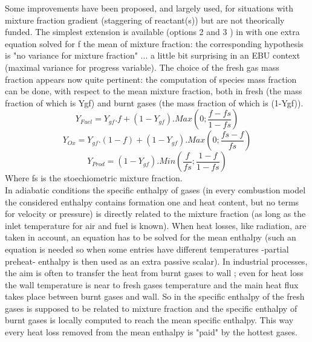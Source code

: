 Some improvements have been proposed, and largely used, for situations
with mixture fraction gradient ({\small staggering of reactant(s)})
but are not theorically funded. The simplest extension is available
({\small options 2 and 3 }) in \CS with one extra equation solved for
f the mean of mixture fraction: the corresponding hypothesis is "no
variance for mixture fraction" ... a little bit surprising in an EBU
context ({\small maximal variance for progress variable}). The choice
of the fresh gas mass fraction appears now quite pertinent: the
computation of species mass fraction can be done, with respect to the
mean mixture fraction, both in fresh ({\small the mass fraction of
which is Ygf}) and burnt gases ({\small the mass fraction of which is
(1-Ygf)}).\\
\begin{equation}
Y_{Fuel} = Y_{gf}.f + (1-Y_{gf}) . Max(0 ; \frac{f-fs}{1-fs})
\end{equation}
\begin{equation}
Y_{Ox} = Y_{gf}.(1-f) + (1-Y_{gf}) . Max(0 ; \frac{fs-f}{fs})
\end{equation}
\begin{equation}
Y_{Prod} = (1-Y_{gf}) . Min( \frac{f}{fs} ; \frac{1-f}{1-fs} )
\end{equation}
Where fs is the stoechiometric mixture fraction.\\

In adiabatic conditions the specific enthalpy of gases ({\small in
every combustion model the considered enthalpy contains formation one
and heat content, but no terms for velocity or pressure}) is directly
related to the mixture fraction ({\small as long as the inlet
temperature for air and fuel is known}). When heat losses, like
radiation, are taken in account, an equation has to be solved for the
mean enthalpy ({\small such an equation is needed so when some entries
have different temperatures -partial preheat- enthalpy is then used as
an extra passive scalar}). In industrial processes, the aim is often
to transfer the heat from burnt gases to wall ; even for heat loss the
wall temperature is near to fresh gases temperature and the main heat
flux takes place between burnt gases and wall. So in \CS the specific
enthalpy of the fresh gases is supposed to be related to mixture
fraction and the specific enthalpy of burnt gases is locally computed
to reach the mean specific enthalpy. This way every heat loss removed
from the mean enthalpy is "paid" by the hottest gases.\\

